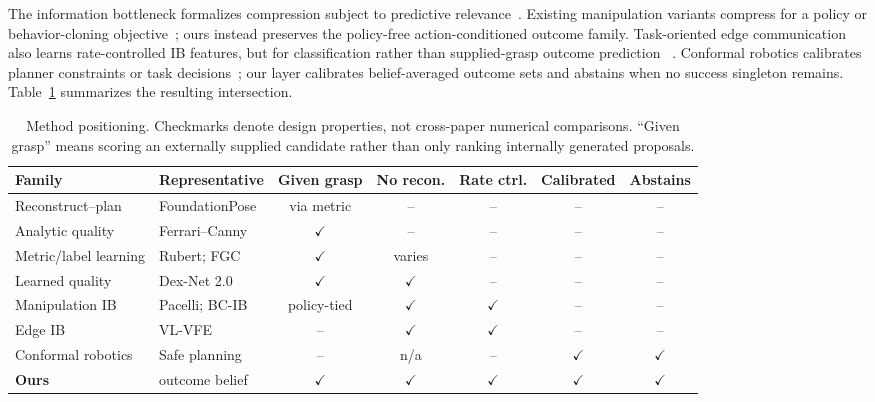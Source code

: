 \documentclass[letterpaper, 10pt, conference]{ieeeconf}
\begin{document}
The information bottleneck formalizes compression subject to predictive
relevance~\cite{tishby1999,alemi2017}. Existing manipulation variants compress
for a policy or behavior-cloning objective~\cite{pacelli2020,bai2025rethinking};
ours instead preserves the policy-free action-conditioned outcome family.
Task-oriented edge communication also learns rate-controlled IB features, but
for classification rather than supplied-grasp outcome prediction
~\cite{shao2022task,matsubara2022split}. Conformal robotics calibrates planner
constraints or task decisions~\cite{vovk2005,lindemann2023safe}; our layer
calibrates belief-averaged outcome sets and abstains when no success singleton
remains. Table~\ref{tab:positioning} summarizes the resulting intersection.

\begin{table}[!t]
\centering
\caption{Method positioning. Checkmarks denote design properties, not
cross-paper numerical comparisons. ``Given grasp'' means scoring an externally
supplied candidate rather than only ranking internally generated proposals.}
\label{tab:positioning}
\scriptsize
\setlength{\tabcolsep}{4pt}
\begin{tabular}{llccccc}
\toprule
Family & Representative & Given grasp & No recon. & Rate ctrl. & Calibrated & Abstains \\
\midrule
Reconstruct--plan & FoundationPose~\cite{wen2024foundationpose} & via metric & -- & -- & -- & -- \\
Analytic quality & Ferrari--Canny~\cite{ferrari1992planning} & $\checkmark$ & -- & -- & -- & -- \\
Metric/label learning & Rubert; FGC~\cite{rubert2017relevance,lu2022hybrid} & $\checkmark$ & varies & -- & -- & -- \\
Learned quality & Dex-Net 2.0~\cite{mahler2017dexnet} & $\checkmark$ & $\checkmark$ & -- & -- & -- \\
Manipulation IB & Pacelli; BC-IB~\cite{pacelli2020,bai2025rethinking} & policy-tied & $\checkmark$ & $\checkmark$ & -- & -- \\
Edge IB & VL-VFE~\cite{shao2022task} & -- & $\checkmark$ & $\checkmark$ & -- & -- \\
Conformal robotics & Safe planning~\cite{lindemann2023safe} & -- & n/a & -- & $\checkmark$ & $\checkmark$ \\
\textbf{Ours} & outcome belief & $\checkmark$ & $\checkmark$ & $\checkmark$ & $\checkmark$ & $\checkmark$ \\
\bottomrule
\end{tabular}
\end{table}
\end{document}
